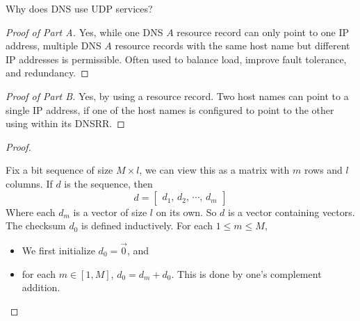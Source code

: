 \documentclass[../../main.tex]{subfiles}
\begin{document}
\begin{wts}
Why does DNS use UDP services? 
\end{wts}
\begin{proof}[Proof of Part A]
    Yes, while one DNS $A$ resource record can only point to one IP address, multiple DNS $A$ resource records with the same host name but different IP addresses is permissible. Often used to balance load, improve fault tolerance, and redundancy.
\end{proof}
\begin{proof}[Proof of Part B]
    Yes, by using a  resource record. Two host names can point to a single IP address, if one of the host names is configured to point to the other using  within its DNSRR.
\end{proof}
\begin{proof}
\begin{definition}
    Fix a bit sequence of size $M\times l$, we can view this as a matrix with $m$ rows and $l$ columns. If $d$ is the sequence, then
    \[d = \begin{bmatrix}d_1,\, d_2,\,\cdots,\,d_m\end{bmatrix}\]
    Where each $d_m$ is a vector of size $l$ on its own. So $d$ is a vector containing vectors.\\
    
    The checksum $d_0$ is defined inductively. For each $1\leq m\leq M$,
    \begin{itemize}
        \item We first initialize $d_0 = \vec{0}$, and
        \item for each $m\in[1,M]$, $d_0 = d_m + d_0$. This is done by one's complement addition.\\
        

\end{itemize}
\end{definition}
\end{proof}
\end{document}
